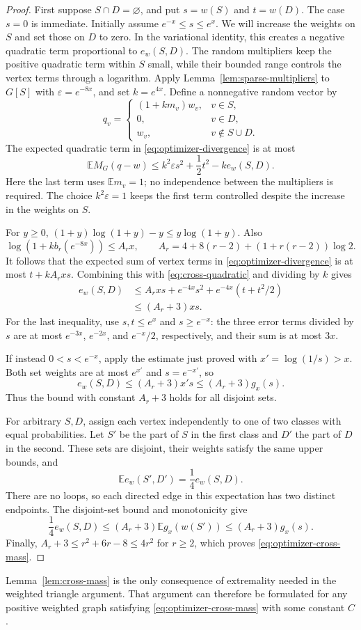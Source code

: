\begin{proof}
First suppose $S\cap D=\varnothing$, and put $s=w(S)$ and $t=w(D)$.
The case $s=0$ is immediate.  Initially assume $e^{-x}\le s\le e^x$.
We will increase the weights on $S$ and set those on $D$ to zero.
In the variational identity, this creates a negative quadratic term
proportional to $e_w(S,D)$. The random multipliers keep the positive
quadratic term within $S$ small, while their bounded range controls the
vertex terms through a logarithm.
Apply Lemma~\ref{lem:sparse-multipliers} to $G[S]$ with
$\varepsilon=e^{-8x}$, and set $k=e^{4x}$.  Define a nonnegative random
vector by
\[
 q_v=
 \begin{cases}
 (1+km_v)w_v,&v\in S,\\
 0,&v\in D,\\
 w_v,&v\notin S\cup D.
 \end{cases}
\]
The expected quadratic term in \eqref{eq:optimizer-divergence} is at most
\begin{equation}\label{eq:cross-quadratic}
 \mathbb E M_G(q-w)
 \le k^2\varepsilon s^2+\frac12t^2-k e_w(S,D).
\end{equation}
Here the last term uses $\mathbb E m_v=1$; no independence between the
multipliers is required. The choice $k^2\varepsilon=1$ keeps the first
term controlled despite the increase in the weights on $S$.

For $y\ge0$,
$(1+y)\log(1+y)-y\le y\log(1+y)$.  Also
\[
 \log(1+kb_r(e^{-8x}))\le A_rx,
 \qquad
 A_r=4+8(r-2)+(1+r(r-2))\log2.
\]
It follows that the expected sum of vertex terms in
\eqref{eq:optimizer-divergence} is at most $t+kA_rxs$.
Combining this with \eqref{eq:cross-quadratic} and dividing by $k$ gives
\begin{align*}
 e_w(S,D)
 &\le A_rxs+e^{-4x}s^2+e^{-4x}(t+t^2/2)\\
 &\le (A_r+3)xs.
\end{align*}
For the last inequality, use $s,t\le e^x$ and $s\ge e^{-x}$: the three
error terms divided by $s$ are at most $e^{-3x}$, $e^{-2x}$, and
$e^{-x}/2$, respectively, and their sum is at most $3x$.

If instead $0<s<e^{-x}$, apply the estimate just proved with
$x'=\log(1/s)>x$.  Both set weights are at most $e^{x'}$ and
$s=e^{-x'}$, so
\[
 e_w(S,D)\le(A_r+3)x's\le(A_r+3)g_x(s).
\]
Thus the bound with constant $A_r+3$ holds for all disjoint sets.

For arbitrary $S,D$, assign each vertex independently to one of two
classes with equal probabilities.  Let $S'$ be the part of $S$ in the
first class and $D'$ the part of $D$ in the second.  These sets are
disjoint, their weights satisfy the same upper bounds, and
\[
 \mathbb E e_w(S',D')=\frac14e_w(S,D).
\]
There are no loops, so each directed edge in this expectation has two
distinct endpoints.  The disjoint-set bound and monotonicity give
\[
 \frac14e_w(S,D)
 \le (A_r+3)\mathbb E g_x(w(S'))
 \le (A_r+3)g_x(s).
\]
Finally, $A_r+3\le r^2+6r-8\le4r^2$ for $r\ge2$, which proves
\eqref{eq:optimizer-cross-mass}.
\end{proof}

Lemma~\ref{lem:cross-mass} is the only consequence of extremality
needed in the weighted triangle argument.  That argument can therefore
be formulated for any positive weighted graph satisfying
\eqref{eq:optimizer-cross-mass} with some constant $C$.
